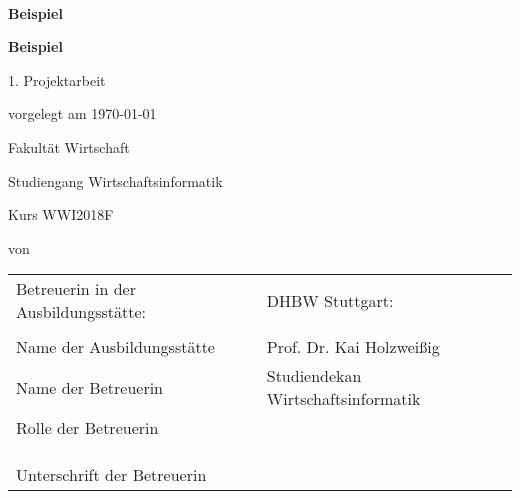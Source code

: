 \newcommand{\typMeinerArbeit}{1. Projektarbeit} 

\newcommand{\themaMeinerArbeit}{Beispiel}
\newcommand{\unterThemaMeinerArbeit}{Beispiel}

\newcommand{\autorDerArbeit}{}

\thispagestyle{empty}

\begin{spacing}{1}
\begin{center}	
~\vspace{0mm}

{\sffamily
\LARGE  
\textbf{\themaMeinerArbeit}

\bigskip
\textbf{\unterThemaMeinerArbeit}
}


\vspace{15mm}

{\Large \typMeinerArbeit}

\vspace{1cm}

vorgelegt am \today 

\vspace{15mm}

Fakultät Wirtschaft
\medskip

Studiengang Wirtschaftsinformatik
\medskip

Kurs WWI2018F 

\vspace{10mm}

von

\vspace{10mm}

{\large\textsc{\autorDerArbeit}}

\vspace{10mm}
\end{center}

\vfill

\begin{tabular}{ll}
Betreuerin in der Ausbildungsstätte: & DHBW Stuttgart: \\
\hspace{0.4\linewidth} & \\
Name der Ausbildungsstätte & Prof. Dr. Kai Holzweißig \\
Name der Betreuerin 
& Studiendekan Wirtschaftsinformatik \\
Rolle der Betreuerin \\
\\
\\
\\
Unterschrift der Betreuerin \\
\end{tabular}



\end{spacing}
